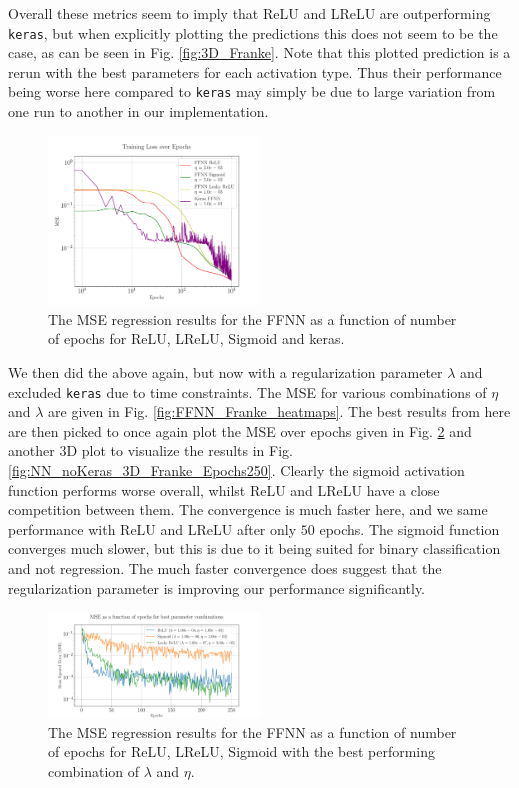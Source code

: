 \documentclass[%
reprint,
amsmath,amssymb,
aps,
]{revtex4-2}
\begin{document}
Overall these metrics seem to imply that ReLU and LReLU are outperforming \texttt{keras}, but when explicitly plotting the predictions this does not seem to be the case, as can be seen in Fig. \ref{fig:3D_Franke}. Note that this plotted prediction is a rerun with the best parameters for each activation type. Thus their performance being worse here compared to \texttt{keras} may simply be due to large variation from one run to another in our implementation.
\begin{figure}[ht!]
	\includegraphics[width=0.5\textwidth]{Python/Figures/NN_MSE_Franke_Epoch.pdf}
	\caption{The MSE regression results for the FFNN as a function of number of epochs for ReLU, LReLU, Sigmoid and keras.}
	\label{fig:NN_Franke_Epochs}
\end{figure}

We then did the above again, but now with a regularization parameter $\lambda$ and excluded \texttt{keras} due to time constraints. The MSE for various combinations of $\eta$ and $\lambda$ are given in Fig. \ref{fig:FFNN_Franke_heatmaps}. The best results from here are then picked to once again plot the MSE over epochs given in Fig. \ref{fig:best_MSE_Franke_Epochs} and another 3D plot to visualize the results in Fig. \ref{fig:NN_noKeras_3D_Franke_Epochs250}. Clearly the sigmoid activation function performs worse overall, whilst ReLU and LReLU have a close competition between them. The convergence is much faster here, and we same performance with ReLU and LReLU after only $50$ epochs. The sigmoid function converges much slower, but this is due to it being suited for binary classification and not regression. The much faster convergence does suggest that the regularization parameter is improving our performance significantly.
\begin{figure}[ht!]
	\includegraphics[width=0.5\textwidth]{Python/Figures/Best_MSE_vs_Epochs.pdf}
	\caption{The MSE regression results for the FFNN as a function of number of epochs for ReLU, LReLU, Sigmoid with the best performing combination of $\lambda$ and $\eta$.}
	\label{fig:best_MSE_Franke_Epochs}
\end{figure}
\end{document}
